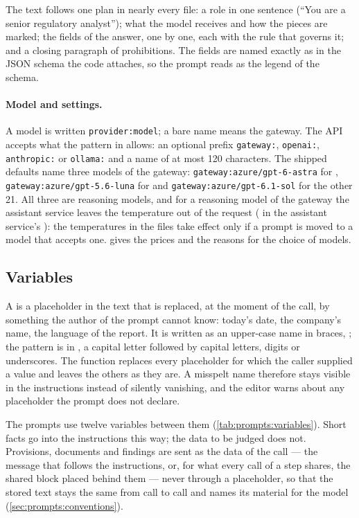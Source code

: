 The text follows one plan in nearly every file: a role in one sentence (\enquote{You are a
senior regulatory analyst}); what the model receives and how the pieces are marked; the fields
of the answer, one by one, each with the rule that governs it; and a closing paragraph of
prohibitions. The fields are named exactly as in the JSON schema the code attaches, so the
prompt reads as the legend of the schema.

\paragraph{Model and settings.} A model is written \texttt{provider:model}; a bare name means
the gateway. The API accepts what the pattern  in 
allows: an optional prefix \texttt{gateway:}, \texttt{openai:}, \texttt{anthropic:} or
\texttt{ollama:} and a name of at most 120 characters. The shipped defaults name three models
of the gateway: \texttt{gateway:azure/gpt-6-astra} for ,
\texttt{gateway:azure/gpt-5.6-luna} for  and
\texttt{gateway:azure/gpt-6.1-sol} for the other 21. All three are reasoning models, and for a
reasoning model of the gateway the assistant service leaves the temperature out of the request
( in the assistant service's ): the
temperatures in the files take effect only if a prompt is moved to a model that accepts one.
 gives the prices and the reasons for the choice of models.

\subsection{Variables}\label{sec:prompts:variables}

A  is a placeholder in the text that is replaced, at the moment of the call,
by something the author of the prompt cannot know: today's date, the company's name, the
language of the report. It is written as an upper-case name in braces, ; the
pattern is  in , a capital letter followed by capital
letters, digits or underscores. The function  replaces every placeholder for which
the caller supplied a value and leaves the others as they are. A misspelt name therefore
stays visible in the instructions instead of silently vanishing, and the editor warns about
any placeholder the prompt does not declare.

The prompts use twelve variables between them (\cref{tab:prompts:variables}). Short facts go
into the instructions this way; the data to be judged does not. Provisions, documents and
findings are sent as the data of the call — the message that follows the instructions, or, for
what every call of a step shares, the shared block placed behind them — never through a
placeholder, so that the stored text stays the same from call to call and names its material
for the model (\cref{sec:prompts:conventions}).

